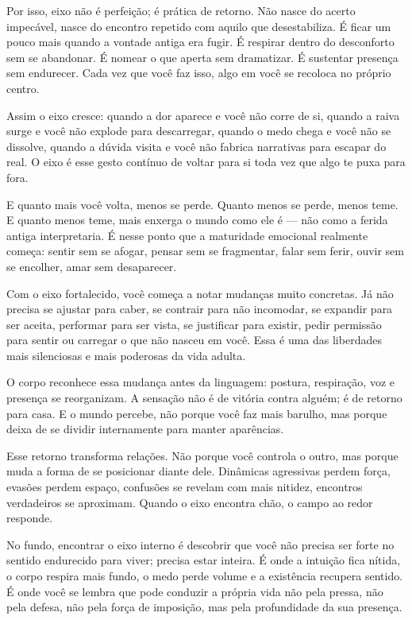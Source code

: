 \documentclass[12pt]{book}
\begin{document}
Por isso, eixo não é perfeição; é prática de retorno. Não nasce do acerto impecável, nasce do encontro repetido com aquilo que desestabiliza. É ficar um pouco mais quando a vontade antiga era fugir. É respirar dentro do desconforto sem se abandonar. É nomear o que aperta sem dramatizar. É sustentar presença sem endurecer. Cada vez que você faz isso, algo em você se recoloca no próprio centro.

Assim o eixo cresce: quando a dor aparece e você não corre de si, quando a raiva surge e você não explode para descarregar, quando o medo chega e você não se dissolve, quando a dúvida visita e você não fabrica narrativas para escapar do real. O eixo é esse gesto contínuo de voltar para si toda vez que algo te puxa para fora.

E quanto mais você volta, menos se perde. Quanto menos se perde, menos teme. E quanto menos teme, mais enxerga o mundo como ele é — não como a ferida antiga interpretaria. É nesse ponto que a maturidade emocional realmente começa: sentir sem se afogar, pensar sem se fragmentar, falar sem ferir, ouvir sem se encolher, amar sem desaparecer.

Com o eixo fortalecido, você começa a notar mudanças muito concretas. Já não precisa se ajustar para caber, se contrair para não incomodar, se expandir para ser aceita, performar para ser vista, se justificar para existir, pedir permissão para sentir ou carregar o que não nasceu em você. Essa é uma das liberdades mais silenciosas e mais poderosas da vida adulta.

O corpo reconhece essa mudança antes da linguagem: postura, respiração, voz e presença se reorganizam. A sensação não é de vitória contra alguém; é de retorno para casa. E o mundo percebe, não porque você faz mais barulho, mas porque deixa de se dividir internamente para manter aparências.

Esse retorno transforma relações. Não porque você controla o outro, mas porque muda a forma de se posicionar diante dele. Dinâmicas agressivas perdem força, evasões perdem espaço, confusões se revelam com mais nitidez, encontros verdadeiros se aproximam. Quando o eixo encontra chão, o campo ao redor responde.

No fundo, encontrar o eixo interno é descobrir que você não precisa ser forte no sentido endurecido para viver; precisa estar inteira. É onde a intuição fica nítida, o corpo respira mais fundo, o medo perde volume e a existência recupera sentido. É onde você se lembra que pode conduzir a própria vida não pela pressa, não pela defesa, não pela força de imposição, mas pela profundidade da sua presença.
\end{document}
